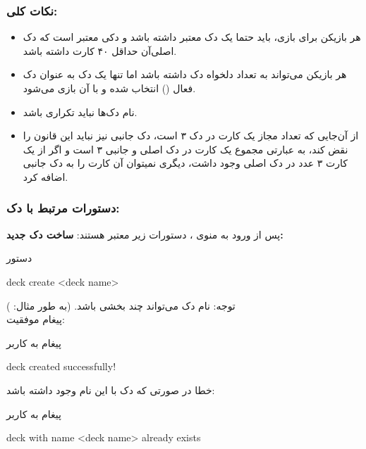 \documentclass[]{article}
\begin{document}
\subsubsection*{{\titr نکات کلی:}}
\begin{itemize}
	\item
	هر بازیکن برای بازی‌، باید حتما یک دک معتبر داشته باشد و دکی معتبر است 
	که دک اصلی‌آن حداقل ۴۰ کارت داشته باشد.
	\item
	هر بازیکن می‌تواند به تعداد دلخواه دک داشته باشد اما تنها یک دک به عنوان 
	دک فعال () انتخاب شده و با آن بازی می‌شود.
	\item
	نام دک‌ها نباید تکراری باشد.
	\item
	از آن‌جایی که تعداد مجاز یک کارت در دک ۳ است، دک جانبی نیز نباید این 
	قانون را نقض کند، به عبارتی مجموع یک کارت در دک اصلی و جانبی ۳ است و 
	اگر از 
	یک کارت ۳ عدد در دک اصلی وجود داشت، دیگری نمیتوان آن کارت را به دک 
	جانبی 
	اضافه کرد.
\end{itemize}

\subsubsection*{{\titr دستورات مرتبط با دک:}}
پس از ورود به منوی ، دستورات زیر معتبر هستند:
\vspace{.5cm}
\textbf{ساخت دک جدید:}
\begin{mybox}[colback=yellow]{دستور}
	\begin{latin}	
		deck create <deck name>
	\end{latin}
\end{mybox}
توجه: نام دک می‌تواند چند بخشی باشد. (به طور مثال: )
\\
پیغام موفقیت:
\begin{mybox}[colback=yellow]{پیغام به کاربر}
	\begin{latin}	
		deck created successfully!
	\end{latin}
\end{mybox}
خطا در صورتی که دک با این نام وجود داشته باشد:
\begin{mybox}[colback=yellow]{پیغام به کاربر}
	\begin{latin}	
		deck with name <deck name> already exists
	\end{latin}
\end{mybox}
\end{document}
